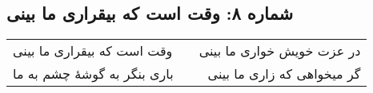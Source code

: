 \begin{center}
\section*{شماره ۸: وقت است که بیقراری ما بینی}
\label{sec:008}
\begin{longtable}{l p{0.5cm} r}
وقت است که بیقراری ما بینی
&&
در عزت خویش خواری ما بینی
\\
باری بنگر به گوشهٔ چشم به ما
&&
گر میخواهی که زاری ما بینی
\\
\end{longtable}
\end{center}
